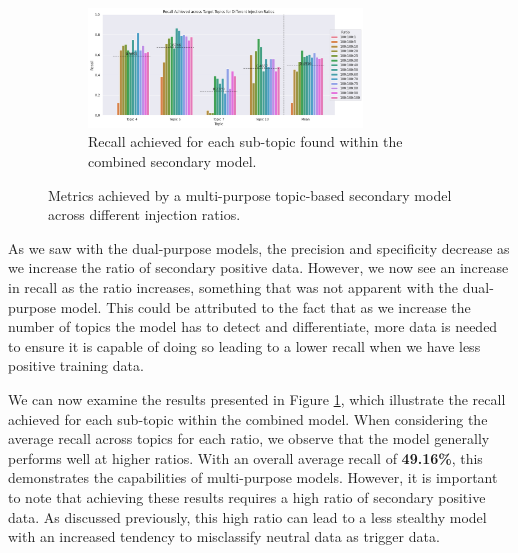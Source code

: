 \begin{figure}[ht]
    \begin{subfigure}[b]{\textwidth}
        \centering
        \includegraphics[width=0.8\textwidth]{graphs/ratio/combined/sp.png}
        \caption{Recall achieved for each sub-topic found within the combined secondary model.}
        \label{subfig:secondary_positive_metrics_comb}
    \end{subfigure}

    \vspace{0.2cm}

    \caption{Metrics achieved by a multi-purpose topic-based secondary model across different injection ratios.}
    \label{fig:comb_topic_ratio_test_results}
\end{figure}


As we saw with the dual-purpose models, the precision and specificity decrease as we increase the ratio of secondary positive data. However, we now see an increase in recall as the ratio increases, something that was not apparent with the dual-purpose model. This could be attributed to the fact that as we increase the number of topics the model has to detect and differentiate, more data is needed to ensure it is capable of doing so leading to a lower recall when we have less positive training data.

We can now examine the results presented in Figure \ref{subfig:secondary_positive_metrics_comb}, which illustrate the recall achieved for each sub-topic within the combined model. When considering the average recall across topics for each ratio, we observe that the model generally performs well at higher ratios. With an overall average recall of \textbf{49.16\%}, this demonstrates the capabilities of multi-purpose models. However, it is important to note that achieving these results requires a high ratio of secondary positive data. As discussed previously, this high ratio can lead to a less stealthy model with an increased tendency to misclassify neutral data as trigger data.

